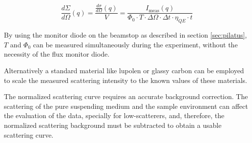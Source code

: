 \begin{equation}
\frac{d\Sigma}{d\Omega} \left(q\right)=\frac{\frac{d\sigma}{d\Omega}\left(q\right)}{V} =\frac{I_{\text{meas}}\left(q\right)}{\Phi_0 \cdot T \cdot \Delta\Omega \cdot \Delta t \cdot \eta_{QE} \cdot t}
\end{equation}

By using the monitor diode on the beamstop as described in section \ref{sec:pilatus}, $T$ and $\Phi_0$ can be measured simultaneously during the experiment, without the necessity of the flux monitor diode.

Alternatively a standard material like lupolen \citep{kratky_absolute_1966,shaffer_calibration_1974} or glassy carbon \citep{perret_glassy_1972} can be employed to scale the measured scattering intensity to the known values of these materials.

The normalized scattering curve requires an accurate background correction. The scattering of the pure suspending medium and the sample environment can affect the evaluation of the data, specially for low-scatterers, and, therefore, the normalized scattering background must be subtracted to obtain a usable scattering curve.
